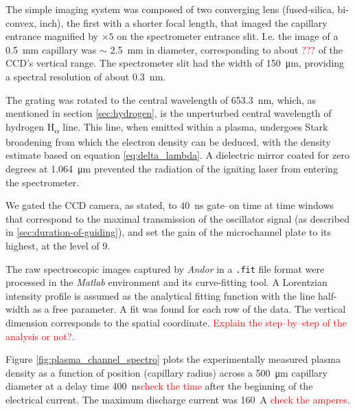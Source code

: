 \documentclass[justified,nofonts,nobib,openany]{tufte-book}
\begin{document}
The simple imaging system was composed of two converging lens (fused-silica, bi-convex,  inch), the first with a shorter focal length, that imaged the capillary entrance magnified by $\times 5$ on the spectrometer entrance slit. I.e. the image of a \SI{0.5}{\mm} capillary was $\sim$ \SI{2.5}{\mm} in diameter, corresponding to about \textcolor{red}{???} of the CCD's vertical range. The spectrometer slit had the width of \SI{150}{\micro\metre}, providing a spectral resolution of about \SI{0.3}{\nm}.

The grating was rotated to the central wavelength of \SI{653.3}{\nm}, which, as mentioned in section \ref{sec:hydrogen}, is the unperturbed central wavelength of hydrogen H\textsubscript{$\alpha$} line. This line, when emitted within a plasma, undergoes Stark broadening from which the electron density can be deduced, with the density estimate based on equation \ref{eq:delta_lambda}. A dielectric mirror coated for zero degrees at \SI{1.064}{\um} prevented the radiation of the igniting laser from entering the spectrometer.

We gated the CCD camera, as stated, to \SI{40}{\ns} gate--on time at time windows that correspond to the maximal transmission of the oscillator signal (as described in \ref{sec:duration-of-guiding}), and set the gain of the microchannel plate to its highest, at the level of 9.

The raw spectroscopic images captured by \textit{Andor} in a \texttt{.fit} file format were processed in the \textit{Matlab} environment and its curve-fitting tool. A Lorentzian intensity profile is assumed as the analytical fitting function with the line half-width as a free parameter. A fit was found for each row of the data. The vertical dimension corresponds to the spatial coordinate. \textcolor{red}{Explain the step--by--step of the analysis or not?.}

Figure \ref{fig:plasma_channel_spectro} plots the experimentally measured plasma density as a function of position (capillary radius) across a \SI{500}{\um} capillary diameter at a delay time \SI{400}{\ns}\textcolor{red}{check the time} after the beginning of the electrical current. The maximum discharge current was \SI{160}{\A} \textcolor{red}{check the amperes}.
\end{document}
